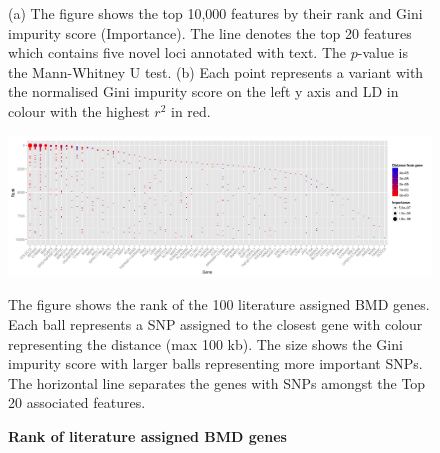 \documentclass[10pt,letterpaper]{article}
\begin{document}
\begin{figure}[tbhp]
\begin{adjustwidth}{-2.00in}{0in}
\begin{subfigure}[b]{0.5\linewidth}
      \label{zoomplot} 
    \end{subfigure} 
    \begin{flushleft}
      (a) The figure shows the top 10,000 features by their rank and Gini impurity score (Importance). The line denotes
      the top 20 features which contains five novel loci annotated with text. The $p$-value is the Mann-Whitney U test.
      (b) Each point represents a variant with the normalised Gini impurity score on the left y axis and LD in colour
      with the highest $r^2$ in red.
     \end{flushleft}
  \end{adjustwidth}
\end{figure}


\begin{figure}[tbhp]
  \begin{adjustwidth}{-2.00in}{0in}
    \caption{\textbf{Rank of literature assigned BMD genes}}
    \label{figure:knowngeneranks}
    \includegraphics[totalheight=6.5cm]{./figs/BMDgenes_landscape.pdf}
    \begin{flushleft}
      The figure shows the rank of the 100 literature assigned BMD genes. Each ball represents a SNP assigned to the closest gene with colour representing the distance (max 100 kb). The size shows the Gini impurity score with larger balls representing more important SNPs. The horizontal line separates the genes with SNPs amongst the Top 20 associated features. 
     \end{flushleft}
  \end{adjustwidth}
\end{figure}





\end{document}
